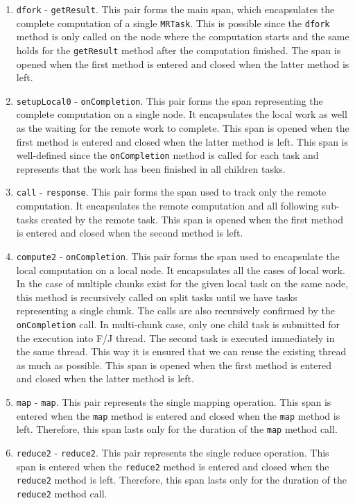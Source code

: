 \begin{enumerate}
	\item \texttt{dfork} - \texttt{getResult}. This pair forms the main span, which encapsulates the complete computation of a single \texttt{MRTask}. This is possible since the \texttt{dfork} method is only called on the node where the computation starts and the same holds for the \texttt{getResult} method after the computation finished. The span is opened when the first method is entered and closed when the latter method is left.
		
	\item \texttt{setupLocal0} - \texttt{onCompletion}. This pair forms the span representing the complete computation on a single node. It encapsulates the local work as well as the waiting for the remote work to complete. This span is opened when the first method is entered and closed when the latter method is left. This span is well-defined since the \texttt{onCompletion} method is called for each task and represents that the work has been finished in all children tasks.
	
	\item \texttt{call} - \texttt{response}. This pair forms the span used to track only the remote computation. It encapsulates the remote computation and all following sub-tasks created by the remote task. This span is opened when the first method is entered and closed when the second method is left.
	
	\item \texttt{compute2} - \texttt{onCompletion}. This pair forms the span used to encapsulate the local computation on a local node. It encapsulates all the cases of local work. In the case of multiple chunks exist for the given local task on the same node, this method is recursively called on split tasks until we have tasks representing a single chunk. The calls are also recursively confirmed by the \texttt{onCompletion} call. In multi-chunk case, only one child task is submitted for the execution into F/J thread. The second task is executed immediately in the same thread. This way it is ensured that we can reuse the existing thread as much as possible. This span is opened when the first method is entered and closed when the latter method is left.
	
	\item \texttt{map} - \texttt{map}. This pair represents the single mapping operation. This span is entered when the \texttt{map} method is entered and closed when the \texttt{map} method is left. Therefore, this span lasts only for the duration of the \texttt{map} method call.
	
	\item \texttt{reduce2} - \texttt{reduce2}. This pair represents the single reduce operation. This span is entered when the \texttt{reduce2} method is entered and closed when the \texttt{reduce2} method is left. Therefore, this span lasts only for the duration of the \texttt{reduce2} method call.
\end{enumerate}

